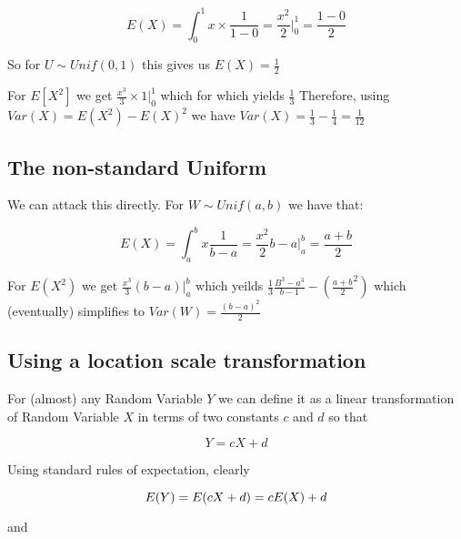 \documentclass[12pt]{extbook}
\begin{document}
\begin{displaymath}
E(X) = \int_0^1 x \times\frac{1}{1-0} = \frac{x^2}{2}|^1_0=\frac{1-0}{2}
\end{displaymath}

So for $U \sim Unif(0,1)$ this gives us $E(X) = \frac{1}{2}$

For $E[X^2]$ we get $\frac{x^3}{3} \times 1 |^1_0$ which for which yields $\frac{1}{3}$  Therefore, using $Var(X)=E(X^2)-E(X)^2$ we have $Var(X)=\frac{1}{3}-\frac{1}{4}=\frac{1}{12}$



\subsection{The non-standard Uniform}

We can attack this directly.   For $W \sim Unif(a,b)$ we have that:

\begin{displaymath}
E(X) = \int_a^b x \frac{1}{b-a} = \frac{x^2}{2}b-a|^b_a=\frac{a+b}{2}
\end{displaymath}

For $E(X^2)$ we get $\frac{x^3}{3}(b-a)|^b_a$ which yeilds $\frac{1}{3}\frac{B^3-a^3}{b-1} - \left(\frac{a+b}{2}^2\right)$ which (eventually) simplifies to $Var(W)=\frac{(b-a)^2}{2}$




\subsection{Using a location scale transformation}

For (almost) any Random Variable $Y$ we can define it as  a linear transformation of Random Variable $X$ in terms of two constants $c$ and $d$ so that

\begin{displaymath}
Y = cX + d
\end{displaymath}

Using standard rules of expectation, clearly 

\begin{displaymath}
E(Y) = E( cX + d) = cE(X) + d\\
\end{displaymath}

and 
\end{document}

